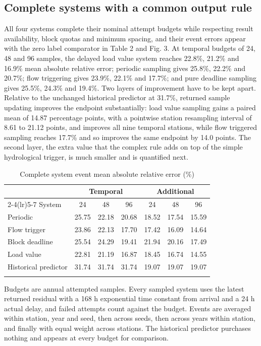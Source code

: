 \documentclass[pdflatex,sn-mathphys-num]{sn-jnl}%
\theoremstyle{thmstyleone}%
\theoremstyle{thmstyletwo}%
\theoremstyle{thmstylethree}%
\begin{document}
\subsection{Complete systems with a common output rule}

All four systems complete their nominal attempt budgets while respecting result availability, block quotas and minimum spacing, and their event errors appear with the zero label comparator in Table 2 and Fig. 3. At temporal budgets of 24, 48 and 96 samples, the delayed load value system reaches 22.8\%, 21.2\% and 16.9\% mean absolute relative error; periodic sampling gives 25.8\%, 22.2\% and 20.7\%; flow triggering gives 23.9\%, 22.1\% and 17.7\%; and pure deadline sampling gives 25.5\%, 24.3\% and 19.4\%. Two layers of improvement have to be kept apart. Relative to the unchanged historical predictor at 31.7\%, returned sample updating improves the endpoint substantially: load value sampling gains a paired mean of 14.87 percentage points, with a pointwise station resampling interval of 8.61 to 21.12 points, and improves all nine temporal stations, while flow triggered sampling reaches 17.7\% and so improves the same endpoint by 14.0 points. The second layer, the extra value that the complex rule adds on top of the simple hydrological trigger, is much smaller and is quantified next.

\begin{table}[htbp]
\caption{Complete system event mean absolute relative error (\%)}\label{tab:2}
\footnotesize
\setlength{\tabcolsep}{2pt}
\begin{tabular}{@{}lcccccc@{}}
\toprule
& \multicolumn{3}{c}{Temporal} & \multicolumn{3}{c}{Additional} \\
\cmidrule(lr){2-4}\cmidrule(lr){5-7}
System & 24 & 48 & 96 & 24 & 48 & 96 \\
\midrule
Periodic & 25.75 & 22.18 & 20.68 & 18.52 & 17.54 & 15.59\\
Flow trigger & 23.86 & 22.13 & 17.70 & 17.42 & 16.09 & 14.64\\
Block deadline & 25.54 & 24.29 & 19.41 & 21.94 & 20.16 & 17.49\\
Load value & 22.81 & 21.19 & 16.87 & 18.45 & 16.74 & 14.55\\
Historical predictor & 31.74 & 31.74 & 31.74 & 19.07 & 19.07 & 19.07\\
\botrule
\end{tabular}
\end{table}

Budgets are annual attempted samples. Every sampled system uses the latest returned residual with a 168 h exponential time constant from arrival and a 24 h actual delay, and failed attempts count against the budget. Events are averaged within station, year and seed, then across seeds, then across years within station, and finally with equal weight across stations. The historical predictor purchases nothing and appears at every budget for comparison.
\end{document}
